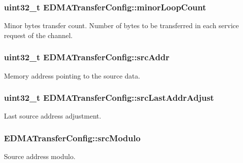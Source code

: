 \subsubsection[{\texorpdfstring{minor\+Loop\+Count}{minorLoopCount}}]{\setlength{\rightskip}{0pt plus 5cm}uint32\+\_\+t E\+D\+M\+A\+Transfer\+Config\+::minor\+Loop\+Count}\hypertarget{structEDMATransferConfig_a749e1b8c1fdbf19e849141670ca3c3d2}{}\label{structEDMATransferConfig_a749e1b8c1fdbf19e849141670ca3c3d2}
Minor bytes transfer count. Number of bytes to be transferred in each service request of the channel. 
\subsubsection[{\texorpdfstring{src\+Addr}{srcAddr}}]{\setlength{\rightskip}{0pt plus 5cm}uint32\+\_\+t E\+D\+M\+A\+Transfer\+Config\+::src\+Addr}\hypertarget{structEDMATransferConfig_aa4084947679d144000e702caf60a4b5a}{}\label{structEDMATransferConfig_aa4084947679d144000e702caf60a4b5a}
Memory address pointing to the source data. 
\subsubsection[{\texorpdfstring{src\+Last\+Addr\+Adjust}{srcLastAddrAdjust}}]{\setlength{\rightskip}{0pt plus 5cm}uint32\+\_\+t E\+D\+M\+A\+Transfer\+Config\+::src\+Last\+Addr\+Adjust}\hypertarget{structEDMATransferConfig_a24aab8f4483f2cb5b1a0583072a860a1}{}\label{structEDMATransferConfig_a24aab8f4483f2cb5b1a0583072a860a1}
Last source address adjustment. 
\subsubsection[{\texorpdfstring{src\+Modulo}{srcModulo}}]{ E\+D\+M\+A\+Transfer\+Config\+::src\+Modulo}\hypertarget{structEDMATransferConfig_a1458ad1e6c16ab87b54947399c1e4f67}{}\label{structEDMATransferConfig_a1458ad1e6c16ab87b54947399c1e4f67}
Source address modulo. 
